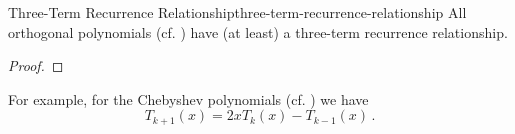 \begin{theorem}{Three-Term Recurrence Relationship}{three-term-recurrence-relationship}
  All orthogonal polynomials (cf. ) have (at least) a three-term recurrence relationship.
\end{theorem}
\begin{proof}
  \hierKoennteIhreWerbungStehen
\end{proof}

For example, for the Chebyshev polynomials (cf. ) we have
$$T_{k+1}(x) = 2x T_k(x) - T_{k-1}(x) \,.$$

